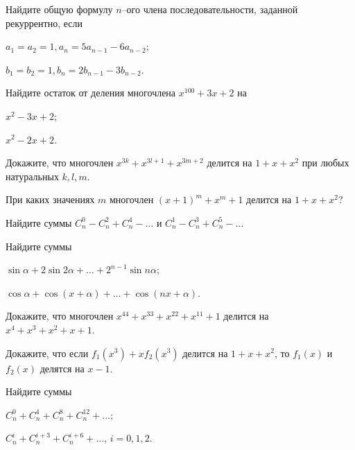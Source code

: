 \documentclass[a4paper, 12pt, num=22]{listok}
\begin{document}
\begin{problem}
	Найдите общую формулу $n$--ого члена последовательности, заданной рекуррентно, если
	\begin{multienum}{2}
		\item $a_1 = a_2 = 1, a_n = 5a_{n-1} - 6a_{n-2}$;
		\item $b_1 = b_2 = 1, b_n = 2b_{n-1} - 3b_{n-2}$.
	\end{multienum}
\end{problem}
\begin{problem}
	Найдите остаток от деления многочлена $x^{100} + 3x + 2$ на
	\begin{multienum}{2}
		\item $x^2 - 3x + 2$;
		\item $x^2 - 2x + 2$.
	\end{multienum}
\end{problem}
\begin{problem}
	Докажите, что многочлен $x^{3k} + x^{3l+1} + x^{3m+2}$ делится на $1 + x + x^2$ при любых натуральных $k, l, m$.
\end{problem}
\begin{problem}
	При каких значениях $m$ многочлен ${(x + 1)}^m + x^m + 1$ делится на $1 + x + x^2$?
\end{problem}
\begin{problem}
	Найдите суммы $C_n^0 - C_n^2 + C_n^4 - \ldots$ и $C_n^1 - C_n^3 + C_n^5 - \ldots$
\end{problem}
\begin{problem}
	Найдите суммы
	\begin{multienum}{2}
		\item $\sin \alpha + 2 \sin{2\alpha} + \ldots + 2^{n-1} \sin{n\alpha}$;
		\item $\cos \alpha + \cos{(x + \alpha)} + \ldots + \cos{(nx + \alpha)}$.
	\end{multienum}
\end{problem}
\begin{problem}
	Докажите, что многочлен $x^{44} + x^{33} + x^{22} + x^{11} + 1$ делится на $x^4 + x^3 + x^2 + x + 1$.
\end{problem}
\begin{problem}
	Докажите, что если $f_1(x^3) + x f_2(x^3)$ делится на $1 + x + x^2$, то $f_1(x)$ и $f_2(x)$ делятся на $x - 1$.
\end{problem}
\begin{problem}
	Найдите суммы
	\begin{multienum}{2}
		\item $C_n^0 + C_n^4 + C_n^8 + C_n^{12} + \ldots$;
		\item $C_n^i + C_n^{i + 3} + C_n^{i + 6} + \ldots$, $i = 0, 1, 2$.
	\end{multienum}
\end{problem}
\end{document}
